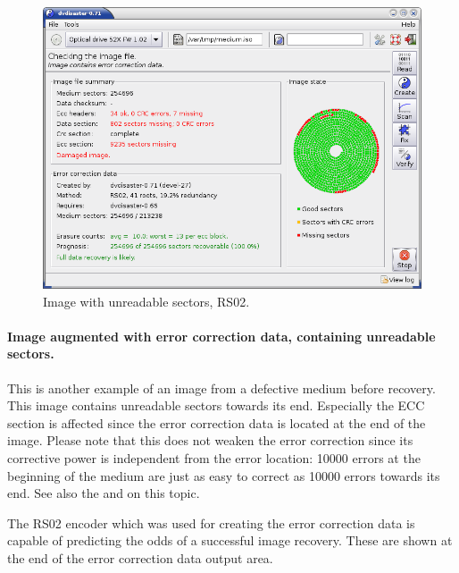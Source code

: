 \begin{figure}[h]
\centerline{\includegraphics[width=\textwidth]{screenshots/info-bad-rs02.png}}
\caption{Image with unreadable sectors, RS02.}
\label{howto-info-bad-rs02}
\end{figure}

\paragraph{Image augmented with error correction data, containing unreadable sectors.} This
is another example of an image from a defective medium before recovery.
This image contains unreadable sectors towards its end. Especially
the ECC section is affected since the error correction data is located
at the end of the image. Please note that this does not weaken the error
correction since its corrective power is independent from the error
location: 10000 errors at the beginning of the medium are just as easy
to correct as 10000 errors towards its end. See also the 
and  on this topic.

\bigskip

The RS02 encoder which was used for creating the error correction data is
capable of predicting the odds of a successful image recovery. These are
shown at the end of the error correction data output area. 

\newpage

